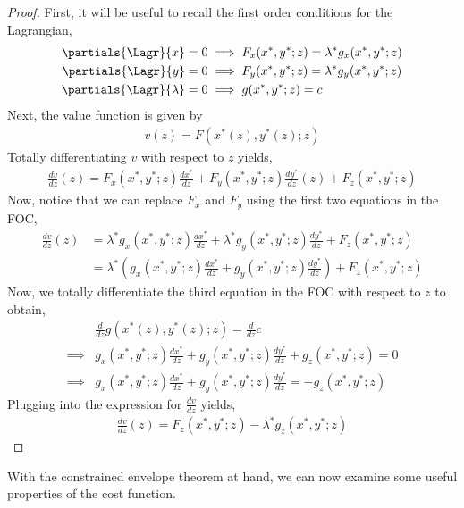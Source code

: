 \begin{proof}
    First, it will be useful to recall the first order conditions for the Lagrangian,
    \begin{align*}
        \partials{\Lagr}{x} = 0 &\implies F_x(x^*, y^*; z) = \lambda^* g_x(x^*, y^*; z) \\
        \partials{\Lagr}{y} = 0 &\implies F_y(x^*, y^*; z) = \lambda^* g_y(x^*, y^*; z) \\
        \partials{\Lagr}{\lambda} = 0 &\implies g(x^*, y^*; z) = c
    \end{align*}
    Next, the value function is given by
    \begin{align*}
        v(z) = F(x^*(z), y^*(z); z) 
    \end{align*}
    Totally differentiating $v$ with respect to $z$ yields,
    \begin{align*}
        \frac{dv}{dz}(z) = F_x(x^*, y^*; z) \frac{dx^*}{dz} + F_y(x^*, y^*; z) \frac{dy^*}{dz}(z) + F_z(x^*, y^*; z)
    \end{align*}
    Now, notice that we can replace $F_x$ and $F_y$ using the first two equations in the FOC,
    \begin{align*}
        \frac{dv}{dz}(z) &= \lambda^* g_x(x^*, y^*; z)  \frac{dx^*}{dz} + \lambda^* g_y(x^*, y^*; z) \frac{dy^*}{dz} + F_z(x^*, y^*; z) \\
        &= \lambda^* \left(g_x(x^*, y^*; z) \frac{dx^*}{dz} + g_y(x^*, y^*; z) \frac{dy^*}{dz}\right) + F_z(x^*, y^*; z)
    \end{align*}
    Now, we totally differentiate the third equation in the FOC with respect to $z$ to obtain,
    \begin{align*}
        &\frac{d}{dz}g(x^*(z), y^*(z); z) = \frac{d}{dz} c \\
        \implies &g_x(x^*, y^*; z) \frac{dx^*}{dz} + g_y(x^*, y^*; z) \frac{dy^*}{dz} + g_z(x^*, y^*; z) = 0 \\
        \implies& g_x(x^*, y^*; z) \frac{dx^*}{dz} + g_y(x^*, y^*; z) \frac{dy^*}{dz} = - g_z(x^*, y^*; z)
    \end{align*}
    Plugging into the expression for $\frac{dv}{dz}$ yields,
    \begin{align*}
        \frac{dv}{dz}(z) = F_z(x^*, y^*; z) - \lambda^* g_z(x^*, y^*; z)
    \end{align*}
\end{proof}

With the constrained envelope theorem at hand, we can now examine some useful properties of the cost function.

